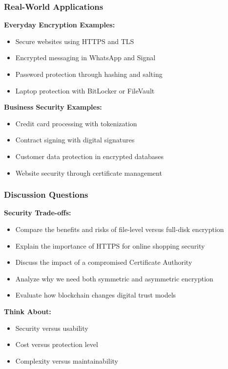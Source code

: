 \documentclass{beamer}
\begin{document}
\begin{frame}
    \frametitle{Real-World Applications}
    
    \textbf{Everyday Encryption Examples:}
    \begin{itemize}
        \item Secure websites using HTTPS and TLS
        \item Encrypted messaging in WhatsApp and Signal
        \item Password protection through hashing and salting
        \item Laptop protection with BitLocker or FileVault
    \end{itemize}
    
    \textbf{Business Security Examples:}
    \begin{itemize}
        \item Credit card processing with tokenization
        \item Contract signing with digital signatures
        \item Customer data protection in encrypted databases
        \item Website security through certificate management
    \end{itemize}
\end{frame}

\begin{frame}
    \frametitle{Discussion Questions}
    
    \textbf{Security Trade-offs:}
    \begin{itemize}
        \item Compare the benefits and risks of file-level versus full-disk encryption
        \item Explain the importance of HTTPS for online shopping security
        \item Discuss the impact of a compromised Certificate Authority
        \item Analyze why we need both symmetric and asymmetric encryption
        \item Evaluate how blockchain changes digital trust models
    \end{itemize}
    
    \textbf{Think About:}
    \begin{itemize}
        \item Security versus usability
        \item Cost versus protection level
        \item Complexity versus maintainability
    \end{itemize}
\end{frame}
\end{document}
